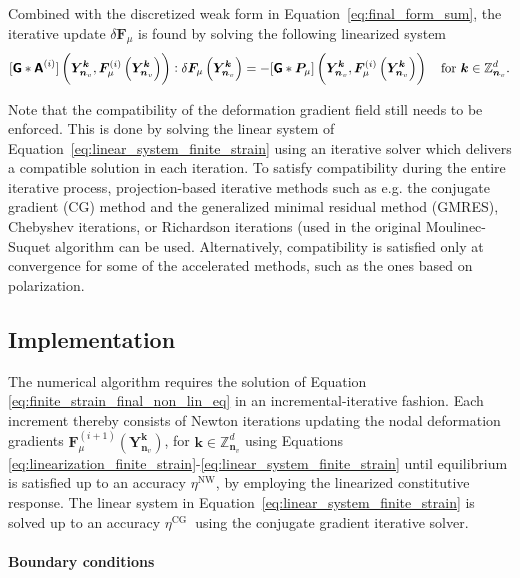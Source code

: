 Combined with the discretized weak form in Equation~\eqref{eq:final_form_sum}, the iterative update \(\delta {\bm{F}_\mu}\) is found by solving the following linearized system
\begin{equation} \label{eq:linear_system_finite_strain}
[\boldsymbol{\mathsf{G}}* \boldsymbol{\mathsf{A}}^{(i)}] \left(\bm Y_{\bm n_v}^{\bm  k}, \bm F_\mu^{(i)}\left(\bm Y_{\bm n_v}^{\bm  k}\right)\right):\delta {\bm{F}_\mu}\left(\bm Y_{\bm n_v}^{\bm  k}\right)=-[\boldsymbol{\mathsf{G}}* \bm{P}_\mu]\left(\bm Y_{\bm n_v}^{\bm  k}, \bm F_\mu^{(i)}\left(\bm Y_{\bm n_v}^{\bm  k}\right)\right)\quad\text{for \(\bm k\in \mathbb Z^d_{\bm n_v}\)}.
\end{equation}

Note that the compatibility of the deformation gradient field still needs to be enforced.
This is done by solving the linear system of Equation~\eqref{eq:linear_system_finite_strain} using an iterative solver which delivers a compatible solution in each iteration.
To satisfy compatibility during the entire iterative process, projection-based iterative methods such as e.g. the conjugate gradient (CG) method and the generalized minimal residual method (GMRES), Chebyshev iterations, or Richardson iterations (used in the original Moulinec-Suquet algorithm \citep{moulinec_fast_1994, moulinec_fft-based_1995} can be used.
Alternatively, compatibility is satisfied only at convergence for some of the accelerated methods, such as the ones based on polarization.

\subsection{Implementation}

The numerical algorithm requires the solution of Equation \eqref{eq:finite_strain_final_non_lin_eq} in an incremental-iterative fashion.
Each increment thereby consists of Newton iterations updating the nodal deformation gradients \(\bm{F}_\mu^{(i+1)}(\bm Y^{\bm k}_{\bm n_v})\), for \(\bm k\in \mathbb Z^d_{\bm n_v}\) using Equations \eqref{eq:linearization_finite_strain}-\eqref{eq:linear_system_finite_strain} until equilibrium is satisfied up to an accuracy \(\eta^{\mathrm{NW}}\), by employing the linearized constitutive response.
The linear system in Equation~\eqref{eq:linear_system_finite_strain} is solved up to an accuracy \(\eta^{\text {CG }}\) using the conjugate gradient iterative solver.
\paragraph{Boundary conditions}

